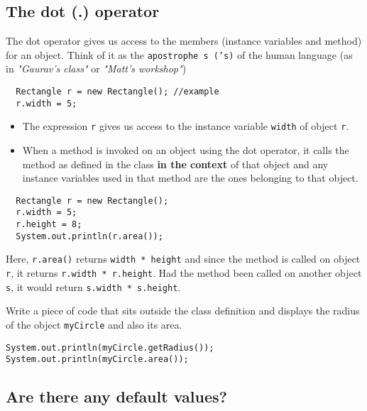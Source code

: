 \subsection{The dot (.) operator}
  The dot operator gives us access to the members (instance variables and method) for an object. Think of it as the \texttt{apostrophe s ('s)} of the human language (as in \emph{"Gaurav's class"} or \emph{"Matt's workshop"})
   
  \begin{lstlisting}
  Rectangle r = new Rectangle(); //example
  r.width = 5;
  \end{lstlisting}


    \begin{itemize}
  	\item The expression \texttt{r} gives us access to the instance variable \texttt{width} of object \texttt{r}.
  
  	\item When a method is invoked on an object using the dot operator, it calls the method as defined in the class \textbf{in the context} of that object and any instance variables used in that method are the ones belonging to that object.
	\end{itemize}

    \begin{lstlisting}
  Rectangle r = new Rectangle(); 
  r.width = 5;
  r.height = 8;
  System.out.println(r.area());
  \end{lstlisting}

  \vskip 0.5cm
  
  
  Here, \texttt{r.area()} returns \texttt{width * height} and since the method is called on object \texttt{r}, it returns \texttt{r.width * r.height}. Had the method been called on another object \texttt{s}, it would return \texttt{s.width * s.height}.
  
\begin{exercise}
Write a piece of code that sits outside the class definition and displays the radius of the object \texttt{myCircle} and also its area.
\end{exercise}
\begin{answer} \begin{lstlisting}
System.out.println(myCircle.getRadius());
System.out.println(myCircle.area());
\end{lstlisting} \end{answer}

\subsection{Are there any default values?}

